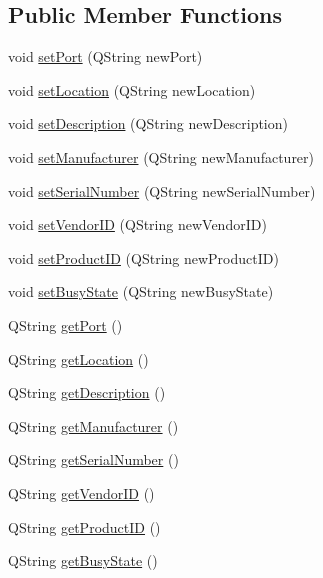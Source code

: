 \subsection*{Public Member Functions}
\begin{DoxyCompactItemize}
\item 
void \mbox{\hyperlink{classPortsClass_a0a7d3dc2ff387559e43d4bbb87aae0f7}{set\+Port}} (Q\+String new\+Port)
\item 
void \mbox{\hyperlink{classPortsClass_a1a5f185d5b9db6407d943187778f3782}{set\+Location}} (Q\+String new\+Location)
\item 
void \mbox{\hyperlink{classPortsClass_a2f06af1956265d0079be56b9b85c3a0f}{set\+Description}} (Q\+String new\+Description)
\item 
void \mbox{\hyperlink{classPortsClass_a0ac6d29d8868c2ebde8811d0249d7e41}{set\+Manufacturer}} (Q\+String new\+Manufacturer)
\item 
void \mbox{\hyperlink{classPortsClass_a42d72f9dd8aff882cb338efe798f1721}{set\+Serial\+Number}} (Q\+String new\+Serial\+Number)
\item 
void \mbox{\hyperlink{classPortsClass_af42f48bd88679919b34f19f0f05673c1}{set\+Vendor\+ID}} (Q\+String new\+Vendor\+ID)
\item 
void \mbox{\hyperlink{classPortsClass_a2bee64115fdaa041202522a909e66e00}{set\+Product\+ID}} (Q\+String new\+Product\+ID)
\item 
void \mbox{\hyperlink{classPortsClass_ad416a34e1604ee80c1aa3f45ac5b1d2c}{set\+Busy\+State}} (Q\+String new\+Busy\+State)
\item 
Q\+String \mbox{\hyperlink{classPortsClass_a0aba12c54c3293a67b28bfc1835b0fd6}{get\+Port}} ()
\item 
Q\+String \mbox{\hyperlink{classPortsClass_a2dea26b21dbd7545b9852d8086ce4657}{get\+Location}} ()
\item 
Q\+String \mbox{\hyperlink{classPortsClass_aabad7eb750a333dc8e8facb741dd62fa}{get\+Description}} ()
\item 
Q\+String \mbox{\hyperlink{classPortsClass_a8a0b3c6b43b97f7a2519942b51cf8db6}{get\+Manufacturer}} ()
\item 
Q\+String \mbox{\hyperlink{classPortsClass_a0fad2da57c4cf364bda2389149844bf7}{get\+Serial\+Number}} ()
\item 
Q\+String \mbox{\hyperlink{classPortsClass_ab855ef36f83175d9178d6c8fde0129cb}{get\+Vendor\+ID}} ()
\item 
Q\+String \mbox{\hyperlink{classPortsClass_a3f8207b8a5519b494aa8ae602019aa32}{get\+Product\+ID}} ()
\item 
Q\+String \mbox{\hyperlink{classPortsClass_a2cfe00d894c50c8b175571455e293497}{get\+Busy\+State}} ()
\end{DoxyCompactItemize}

